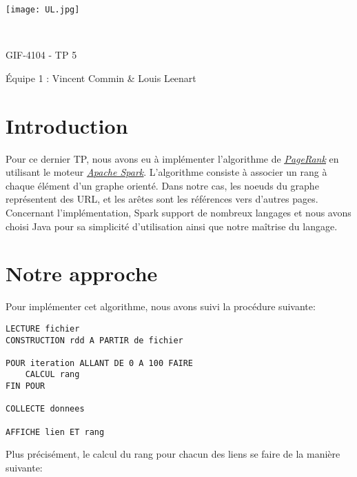 \documentclass[a4paper, french]{article}
\author{Vincent Commin \& Louis Leenart}
\date{\today}
\begin{document}
\begin{titlepage}
    \begin{flushleft}
        \texttt{[image: UL.jpg]}\par
        \centering

        \vspace{13\baselineskip}
        \HRule \\[0.4cm]

        {\Huge
        GIF-4104 - TP 5\par}
        \vspace{0.4cm}
        \HRule
        \vfill
        Équipe 1 : Vincent Commin \& Louis Leenart\medskip \par
    \end{flushleft}
\end{titlepage}

\newpage
\section{Introduction}

Pour ce dernier TP, nous avons eu à implémenter l'algorithme de \href{https://en.wikipedia.org/wiki/PageRank}{\textit{\underline{PageRank}}} en utilisant le moteur \href{https://spark.apache.org/}{\textit{\underline{Apache Spark}}}. L'algorithme consiste à associer un rang à chaque élément d'un graphe orienté. Dans notre cas, les noeuds du graphe représentent des URL, et les arêtes sont les références vers d'autres pages. Concernant l'implémentation, Spark support de nombreux langages et nous avons choisi Java pour sa simplicité d'utilisation ainsi que notre maîtrise du langage.

\section{Notre approche}

Pour implémenter cet algorithme, nous avons suivi la procédure suivante:

\begin{lstlisting}[style=txt]
LECTURE fichier
CONSTRUCTION rdd A PARTIR de fichier

POUR iteration ALLANT DE 0 A 100 FAIRE
    CALCUL rang
FIN POUR

COLLECTE donnees

AFFICHE lien ET rang
\end{lstlisting}

Plus précisément, le calcul du rang pour chacun des liens se faire de la manière suivante:
\end{document}
